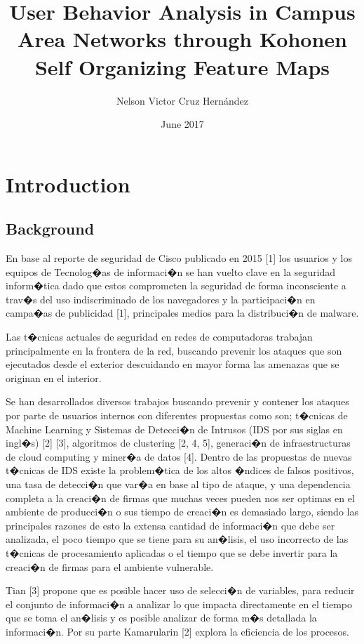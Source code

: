 \documentclass{article}
\title{User Behavior Analysis in Campus Area Networks through Kohonen Self Organizing Feature Maps}
\author{Nelson Victor Cruz Hern\'andez }
\date{June 2017}
\begin{document}
\maketitle






\section{Introduction} %




\subsection{Background} %
En base al reporte de seguridad de Cisco publicado en 2015 [1] los usuarios y los equipos de Tecnolog�as de informaci�n se han vuelto clave en la seguridad inform�tica dado que estos comprometen la seguridad de forma inconsciente a trav�s del uso indiscriminado de los navegadores y la participaci�n en campa�as de publicidad [1], principales medios para la distribuci�n de malware.

Las t�cnicas actuales de seguridad en redes de computadoras trabajan principalmente en la frontera de la red, buscando prevenir los ataques que son ejecutados desde el exterior descuidando en mayor forma las amenazas que se originan en el interior. 

Se han desarrollados diversos trabajos buscando prevenir y contener los ataques por parte de usuarios internos con diferentes propuestas como son; t�cnicas de Machine Learning y Sistemas de Detecci�n de Intrusos (IDS por sus siglas en ingl�s) [2] [3], algoritmos de clustering [2, 4, 5], generaci�n de infraestructuras de cloud computing y miner�a de datos [4]. 
Dentro de las propuestas de nuevas t�cnicas de IDS existe la problem�tica de los altos �ndices de falsos positivos, una tasa de detecci�n que var�a en base al tipo de ataque, y una dependencia completa a la creaci�n de firmas que muchas veces pueden nos ser optimas en el ambiente de producci�n o sus tiempo de creaci�n es demasiado largo, siendo las principales razones de esto la extensa cantidad de informaci�n que debe ser analizada, el poco tiempo que se tiene para su an�lisis, el uso incorrecto de las t�cnicas de procesamiento aplicadas o el tiempo que se debe invertir para la creaci�n de firmas para el ambiente vulnerable.

Tian [3] propone que es posible hacer uso de selecci�n de variables, para  reducir el conjunto de informaci�n a analizar lo que impacta directamente en el tiempo que se toma el an�lisis y es posible analizar de forma m�s detallada la informaci�n. Por su parte Kamarularin [2] explora la eficiencia de los procesos.
\end{document}
